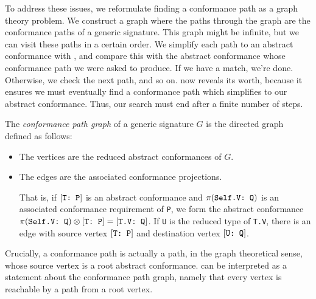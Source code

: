 \documentclass[../generics]{subfiles}
\begin{document}
To address these issues, we reformulate finding a conformance path as a graph theory problem. We construct a graph where the paths through the graph are the conformance paths of a generic signature. This graph might be infinite, but we can visit these paths in a certain order. We simplify each path to an abstract conformance with , and compare this with the abstract conformance whose conformance path we were asked to produce. If we have a match, we're done. Otherwise, we check the next path, and so on.  now reveals its worth, because it ensures we must eventually find a conformance path which simplifies to our abstract conformance. Thus, our search must end after a finite number of steps.

\begin{definition}
The \emph{conformance path graph} of a generic signature $G$ is the directed graph defined as follows:
\begin{itemize}
\item The vertices are the reduced abstract conformances of $G$.
\item The edges are the associated conformance projections.

That is, if $[\texttt{T:~P}]$ is an abstract conformance and $\pi(\texttt{Self.V:~Q})$ is an associated conformance requirement of \texttt{P}, we form the abstract conformance $\pi(\texttt{Self.V:~Q})\otimes [\texttt{T:~P}]=[\texttt{T.V:~Q}]$. If \texttt{U} is the reduced type of \texttt{T.V}, there is an edge with source vertex $[\texttt{T:~P}]$ and destination vertex $[\texttt{U:~Q}]$.
\end{itemize}

\vfill
\eject

Crucially, a conformance path is actually a path, in the graph theoretical sense, whose source vertex is a root abstract conformance.  can be interpreted as a statement about the conformance path graph, namely that every vertex is reachable by a path from a root vertex.
\end{definition}
\end{document}
